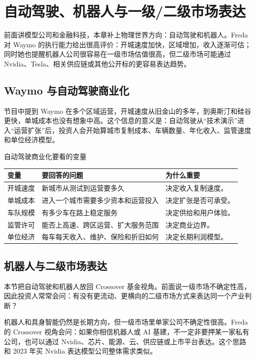 \section{自动驾驶、机器人与一级/二级市场表达}

前面讲模型公司和金融科技，本章补上物理世界方向：自动驾驶和机器人。Freda 对 Waymo 的执行能力给出很高评价：开城速度加快，区域增加，收入逐渐可估；同时她也提醒机器人公司很容易在一级市场估值很高，但二级市场可能通过 Nvidia、Tesla、相关供应链或其他公开标的更容易表达趋势。

\subsection{Waymo 与自动驾驶商业化}

节目中提到 Waymo 在多个区域运营，开城速度从旧金山的多年，到奥斯汀和硅谷更快，单城成本也没有想象中高。这个信息的意义是：自动驾驶从“技术演示”进入“运营扩张”后，投资人会开始算城市复制成本、车辆数量、年化收入、监管速度和单位经济模型。

\begin{knowledgebox}{自动驾驶商业化要看的变量}
\begin{tabularx}{\textwidth}{p{}p{}X}
\toprule
变量 & 要回答的问题 & 为什么重要 \\
\midrule
开城速度 & 新城市从测试到运营要多久 & 决定收入复制速度。 \\
单城成本 & 进入一个城市需要多少资本和运营投入 & 决定扩张是否可承受。 \\
车队规模 & 有多少车在路上稳定服务 & 决定供给和用户体验。 \\
监管许可 & 能否上高速、跨区运营、扩大服务范围 & 决定商业边界。 \\
单位经济 & 每车每天收入、维护、保险和折旧如何 & 决定长期利润模型。 \\
\bottomrule
\end{tabularx}
\end{knowledgebox}

\subsection{机器人与二级市场表达}

本节把自动驾驶和机器人放回 Crossover 基金视角。前面说一级市场不确定性高，因此投资人常常会问：有没有更流动、更横向的二级市场方式来表达同一个产业判断？

机器人和具身智能仍然是长期方向，但一级市场里单家公司不确定性很高。Freda 的 Crossover 视角会问：如果你相信机器人或 AI 基建，不一定非要押某一家私有公司，也可以通过 Nvidia、芯片、能源、云、供应链或上市平台表达。这个思路和 2023 年买 Nvidia 表达模型公司整体需求类似。

